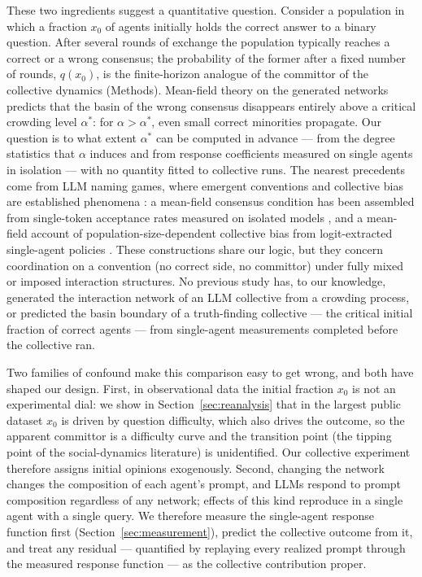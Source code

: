 \documentclass[11pt]{article}
\newcommand{\astar}{\alpha^{*}}
\begin{document}
These two ingredients suggest a quantitative question. Consider a population
in which a fraction $x_0$ of agents initially holds the correct answer to a
binary question. After several rounds of exchange the population typically
reaches a correct or a wrong consensus; the probability of the former after
a fixed number of rounds, $q(x_0)$, is the finite-horizon analogue of the
committor of the collective dynamics (Methods). Mean-field theory on
the generated networks predicts that the basin of the wrong consensus
disappears entirely above a critical crowding level $\astar$: for
$\alpha > \astar$, even small correct minorities propagate. Our question is to
what extent $\astar$ can be computed in advance --- from the degree statistics
that $\alpha$ induces and from response coefficients measured on single agents
in isolation --- with no quantity fitted to collective runs. The nearest precedents come from LLM naming games, where emergent
conventions and collective bias are established phenomena
\citep{Ashery2025, Flint2026}: a mean-field consensus condition has been
assembled from single-token acceptance rates measured on isolated models
\citep{DeNobili2026}, and a mean-field account of population-size-dependent
collective bias from logit-extracted single-agent policies
\citep{Flint2026}. These constructions share our logic, but they concern
coordination on a convention (no correct side, no committor) under
fully mixed or imposed interaction structures. No previous study has, to our knowledge,
generated the interaction network of an LLM collective from a crowding
process, or predicted the basin boundary of a truth-finding collective ---
the critical initial fraction of correct agents --- from single-agent
measurements completed before the collective ran.

Two families of confound make this comparison easy to get wrong, and both have
shaped our design. First, in observational data the initial fraction $x_0$ is
not an experimental dial: we show in Section~\ref{sec:reanalysis} that in the
largest public dataset $x_0$ is driven by question difficulty, which also
drives the outcome, so the apparent committor is a difficulty curve and the transition point (the tipping point of the social-dynamics literature) is unidentified. Our collective experiment therefore assigns
initial opinions exogenously. Second, changing the network changes the
composition of each agent's prompt, and LLMs respond to prompt composition
regardless of any network; effects of this kind reproduce in a single agent
with a single query. We therefore measure the single-agent response function
first (Section~\ref{sec:measurement}), predict the collective outcome from it,
and treat any residual --- quantified by replaying every realized prompt
through the measured response function --- as the collective contribution proper.
\end{document}
